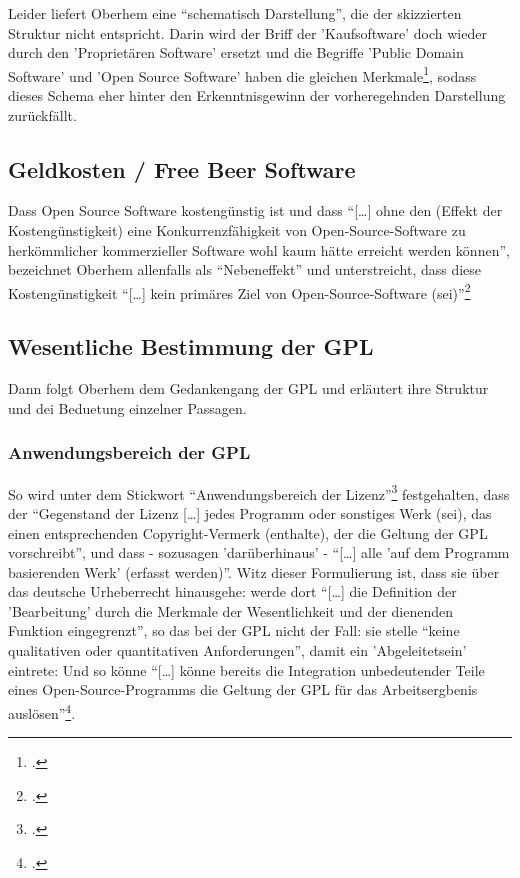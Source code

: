 \documentclass[DIV=calc,BCOR=5mm,11pt,headings=small,oneside,abstract=true, toc=bib]{scrartcl}
\begin{document}
Leider liefert Oberhem eine \enquote{schematisch Darstellung}, die der
skizzierten Struktur nicht entspricht. Darin wird der Briff der 'Kaufsoftware'
doch wieder durch den 'Proprietären Software' ersetzt und die Begriffe 'Public
Domain Software' und 'Open Source Software' haben die gleichen
Merkmale\footcite[vgl.][33]{Oberhem2008a}, sodass dieses Schema eher hinter den
Erkenntnisgewinn der vorheregehnden Darstellung zurückfällt.


\subsection{Geldkosten / Free Beer Software}

Dass Open Source Software kostengünstig ist und dass \enquote{[\ldots]
ohne den (Effekt der Kostengünstigkeit) eine Konkurrenzfähigkeit von
Open-Source-Software zu herkömmlicher kommerzieller Software wohl kaum
hätte erreicht werden können}, bezeichnet Oberhem allenfalls als
\enquote{Nebeneffekt} und unterstreicht, dass diese Kostengünstigkeit
\enquote{[\ldots] kein primäres Ziel von Open-Source-Software
(sei)}\footcite[vgl.][8]{Oberhem2008a}

\subsection{Wesentliche Bestimmung der GPL}

Dann folgt Oberhem dem Gedankengang der GPL und erläutert ihre Struktur und dei
Beduetung einzelner Passagen.

\subsubsection{Anwendungsbereich der GPL}

So wird unter dem Stickwort \enquote{Anwendungsbereich der
Lizenz}\footcite[vgl.][34]{Oberhem2008a} festgehalten, dass der
\enquote{Gegenstand der Lizenz [\ldots] jedes Programm oder sonstiges Werk
(sei), das einen entsprechenden Copyright-Vermerk (enthalte), der die
Geltung der GPL vorschreibt}, und dass - sozusagen 'darüberhinaus' -
\enquote{[\ldots] alle 'auf dem Programm basierenden Werk' (erfasst
werden)}. Witz dieser Formulierung ist, dass sie über das deutsche
Urheberrecht hinausgehe: werde dort \enquote{[\ldots] die Definition der
'Bearbeitung' durch die Merkmale der Wesentlichkeit und der dienenden
Funktion eingegrenzt}, so das bei der GPL nicht der Fall: sie stelle
\enquote{keine qualitativen oder quantitativen Anforderungen}, damit ein
'Abgeleitetsein' eintrete: Und so könne \enquote{[\ldots] könne bereits die
Integration unbedeutender Teile eines Open-Source-Programms die Geltung
der GPL für das Arbeitsergbenis
auslösen}\footcite[vgl.][35]{Oberhem2008a}.
\end{document}

